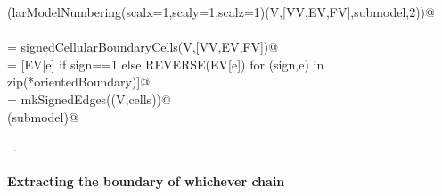 \documentclass[11pt,oneside]{article}    %
\begin{document}
\begin{flushleft}
\begin{list}{}{}
\mbox{}\verb@VIEW(larModelNumbering(scalx=1,scaly=1,scalz=1)(V,[VV,EV,FV],submodel,2))@\\
\mbox{}\verb@@\\
\mbox{}\verb@orientedBoundary = signedCellularBoundaryCells(V,[VV,EV,FV])@\\
\mbox{}\verb@cells = [EV[e] if sign==1 else REVERSE(EV[e]) for (sign,e) in zip(*orientedBoundary)]@\\
\mbox{}\verb@submodel = mkSignedEdges((V,cells))@\\
\mbox{}\verb@VIEW(submodel)@\\
\mbox{}\verb@@{\NWsep}
\end{list}
\vspace{-1ex}
\footnotesize\addtolength{\baselineskip}{-1ex}
\begin{list}{}{\setlength{\itemsep}{-\parsep}\setlength{\itemindent}{-\leftmargin}}
\item \NWtxtMacroRefIn\ .
\end{list}
\end{flushleft}


\paragraph{Extracting the boundary of whichever chain}
\end{document}
